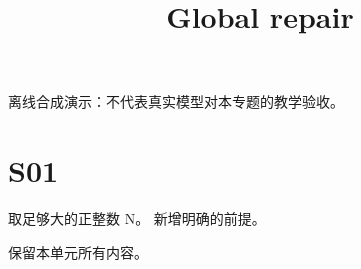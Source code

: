 \documentclass[UTF8,fontset=fandol,11pt]{ctexart}
\title{Global repair}
\date{}
\begin{document}
\maketitle
\par\noindent 离线合成演示：不代表真实模型对本专题的教学验收。\par
\section{S01}\label{sec:S01}
取足够大的正整数 N。 新增明确的前提。\par
保留本单元所有内容。\par
\end{document}
